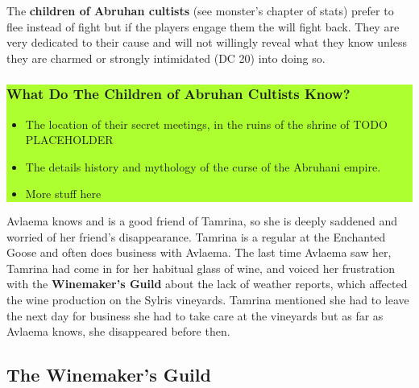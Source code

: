 \begin{multicols*}{2}
The \textbf{children of Abruhan cultists} (see monster's chapter of stats) prefer to flee instead of fight but if the players engage them the will fight back. They are very dedicated to their cause and will not willingly reveal what they know unless they are charmed or strongly intimidated (DC 20) into doing so.
\break

\colorbox{GreenYellow}{\begin{minipage}{0.4\textwidth}
		\subsubsection*{What Do The Children of Abruhan Cultists Know?}
		\begin{itemize}
			\item The location of their secret meetings, in the ruins of the shrine of TODO PLACEHOLDER
			\item The details history and mythology of the curse of the Abruhani empire.
			\item More stuff here
		\end{itemize}
\end{minipage}}
\break

Avlaema knows and is a good friend of Tamrina, so she is deeply saddened and worried of her friend's disappearance. Tamrina is a regular at the Enchanted Goose and often does business with Avlaema. The last time Avlaema saw her, Tamrina had come in for her habitual glass of wine, and voiced her frustration with the \textbf{Winemaker's Guild} about the lack of weather reports, which affected the wine production on the Sylris vineyards. Tamrina mentioned she had to leave the next day for business she had to take care at the vineyards but as far as Avlaema knows, she disappeared before then.


\end{multicols*}


\subsection{The Winemaker's Guild}


\pagebreak
